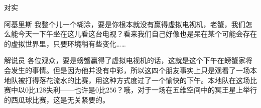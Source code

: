 \begin{dialog}{对实}
\begin{dialogue}
\item[阿基里斯]我整个儿一个糊涂，要是你根本就没有赢得虚拟电视机，老蟹，我们怎么能今天一下午坐在这儿看这台电视？看来我们自己好像也是呆在某个可能会存在的虚拟世界里，只要环境稍有些变化……

\item[解说员]各位观众，要是螃蟹贏得了虚拟电视机的话，这就是这个下午在螃蟹家将会发生的事情。但是因为他并没有中彩，所以这四个朋友事实上只是观看了一场本地队被打得落花流水的比赛，用这种方式度过了一个愉快的下午。本地队在这场比赛中以$0$比$128$失利——也许是$0$比$256$？哦，对于一场在五维空间中的冥王星上举行的西瓜球比赛，这是无关紧要的。

\end{dialogue}

\end{dialog}

